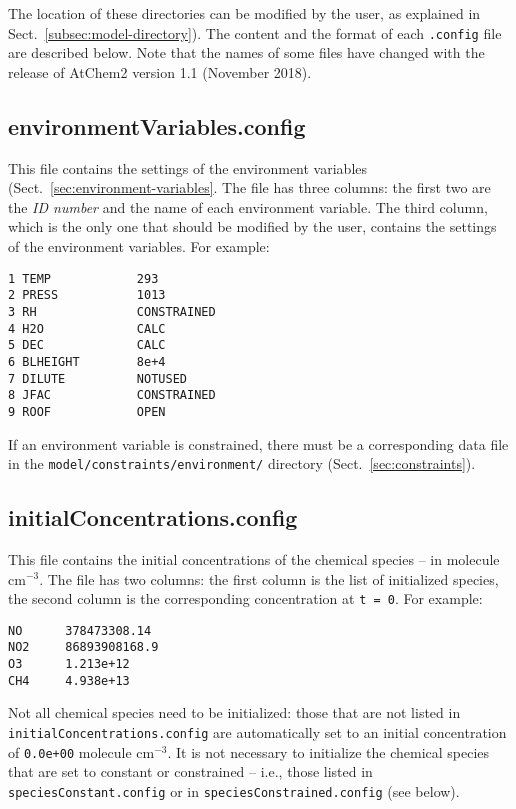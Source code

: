 The location of these directories can be modified by the user, as
explained in Sect.~\ref{subsec:model-directory}). The content and the
format of each \texttt{.config} file are described below. Note that
the names of some files have changed with the release of AtChem2
version 1.1 (November 2018).

\subsection{environmentVariables.config} \label{subsec:environmentvariables}

This file contains the settings of the environment variables
(Sect.~\ref{sec:environment-variables}. The file has three columns:
the first two are the \emph{ID number} and the name of each
environment variable. The third column, which is the only one that
should be modified by the user, contains the settings of the
environment variables. For example:

\begin{verbatim}
1 TEMP            293
2 PRESS           1013
3 RH              CONSTRAINED
4 H2O             CALC
5 DEC             CALC
6 BLHEIGHT        8e+4
7 DILUTE          NOTUSED
8 JFAC            CONSTRAINED
9 ROOF            OPEN
\end{verbatim}

If an environment variable is constrained, there must be a
corresponding data file in the \texttt{model/constraints/environment/}
directory (Sect.~\ref{sec:constraints}).

\subsection{initialConcentrations.config} \label{subsec:initialconcentrations}

This file contains the initial concentrations of the chemical species
-- in molecule cm$^{-3}$. The file has two columns: the first column
is the list of initialized species, the second column is the
corresponding concentration at \texttt{t\ =\ 0}. For example:

\begin{verbatim}
NO      378473308.14
NO2     86893908168.9
O3      1.213e+12
CH4     4.938e+13
\end{verbatim}

Not all chemical species need to be initialized: those that are not
listed in \texttt{initialConcentrations.config} are automatically set
to an initial concentration of \texttt{0.0e+00} molecule cm$^{-3}$. It
is not necessary to initialize the chemical species that are set to
constant or constrained -- i.e., those listed in
\texttt{speciesConstant.config} or in \texttt{speciesConstrained.config}
(see below).


